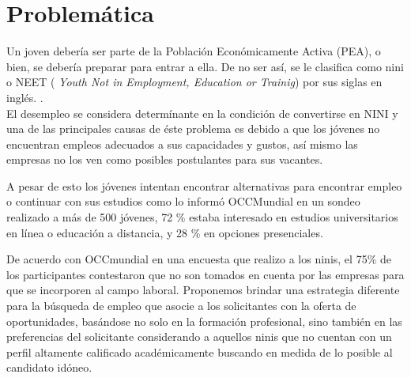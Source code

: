 %
\newpage
\section{Problemática}

Un joven debería ser parte de la Población Económicamente Activa (PEA), o bien, se debería preparar para entrar a ella. De no ser así, %
se le clasifica como nini o NEET ( \textit{Youth Not in Employment, Education or Trainig}) por sus siglas en inglés. \cite{BenitoDuranRomo} \cite{OECD1}.\\



El desempleo se considera determínante en la condición de convertirse en NINI y una de las principales causas de éste problema es debido a que los jóvenes no encuentran empleos adecuados a sus capacidades y gustos, así mismo las empresas no los ven como posibles postulantes para sus vacantes.

A pesar de esto los jóvenes intentan encontrar alternativas para encontrar empleo o continuar con sus estudios como lo informó OCCMundial en un sondeo realizado a más de 500 jóvenes, 72 \% estaba interesado en estudios universitarios en línea o educación a distancia, y 28 \% en opciones presenciales. \cite{Forbes_Universidad}\cite{Parametria}\cite{OCC}

De acuerdo con OCCmundial en una encuesta que realizo a los ninis, el 75\% de los participantes contestaron que no son tomados en cuenta por las empresas para que se incorporen al campo laboral. Proponemos brindar una estrategia diferente para la búsqueda de empleo que asocie a los solicitantes con la oferta de oportunidades, basándose no solo en la formación profesional, sino también en las preferencias del solicitante considerando a aquellos ninis que no cuentan con un perfil altamente calificado académicamente buscando en medida de lo posible al candidato idóneo.\\

